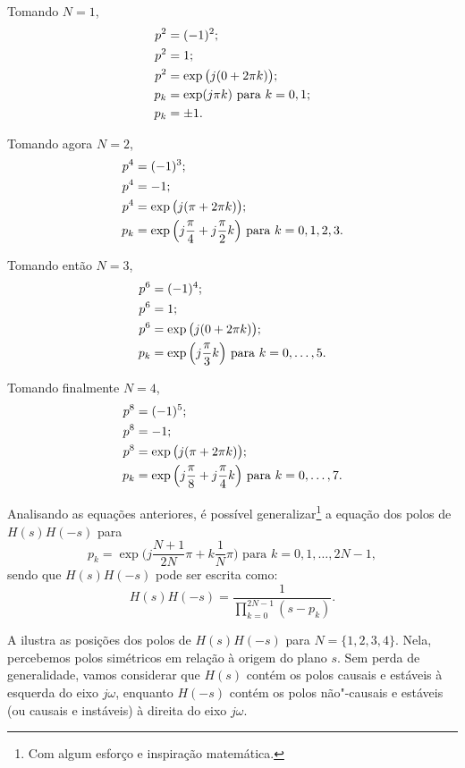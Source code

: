 Tomando $N=1$,
\begin{align}
	p^2&=(-1)^{2};\notag\\
	p^2&=1;\notag\\
	p^2&=\exp\big(j(0+2\pi k)\big);\notag\\
	p_k&=\exp(j\pi k)\text{ para }k=0,1;\\
	p_k&=\pm1.
\end{align}

Tomando agora $N=2$,
\begin{align}
	p^4&=(-1)^{3};\notag\\
	p^4&=-1;\notag\\
	p^4&=\exp\big(j(\pi+2\pi k)\big);\notag\\
	p_k&=\exp\Big(j\frac{\pi}{4}+j\frac{\pi}{2}k\Big)\text{ para }k=0,1,2,3.
\end{align}

Tomando então $N=3$,
\begin{align}
	p^6&=(-1)^{4};\notag\\
	p^6&=1;\notag\\
	p^6&=\exp\big(j(0+2\pi k)\big);\notag\\
	p_k&=\exp\Big(j\frac{\pi}{3}k\Big)\text{ para }k=0,\ldots,5.
\end{align}

Tomando finalmente $N=4$,
\begin{align}
	p^8&=(-1)^{5};\notag\\
	p^8&=-1;\notag\\
	p^8&=\exp\big(j(\pi+2\pi k)\big);\notag\\
	p_k&=\exp\Big(j\frac{\pi}{8}+j\frac{\pi}{4}k\Big)\text{ para }k=0,\ldots,7.
\end{align}

Analisando as equações anteriores, é possível generalizar\footnote{Com algum esforço e inspiração matemática.} a equação dos polos de $H(s)H(-s)$ para
\begin{equation}
	p_k=\exp\bigg(j\frac{N+1}{2N}\pi+k\frac{1}{N}\pi\bigg)\text{ para }k=0,1,\ldots,2N-1,
\end{equation}
sendo que $H(s)H(-s)$ pode ser escrita como:
\begin{equation}
    H(s)H(-s)=\frac{1}{\displaystyle\prod_{k=0}^{2N-1}(s-p_k)}.
\end{equation}

A  ilustra as posições dos polos de $H(s)H(-s)$ para $N=\{1,2,3,4\}$. Nela, percebemos polos simétricos em relação à origem do plano $s$. Sem perda de generalidade, vamos considerar que $H(s)$ contém os polos causais e estáveis à esquerda do eixo $j\omega$, enquanto $H(-s)$ contém os polos não"-causais e estáveis (ou causais e instáveis) à direita do eixo $j\omega$.

